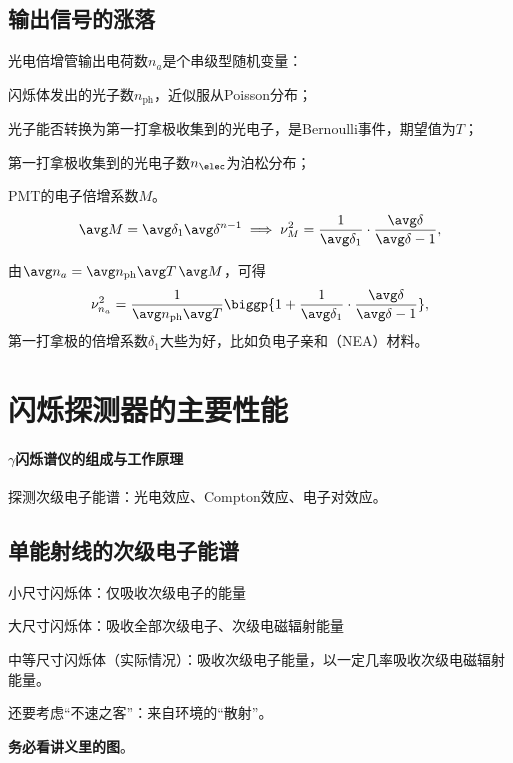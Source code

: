 \subsection{输出信号的涨落}

光电倍增管输出电荷数$n_a$是个串级型随机变量：
\begin{compactitem}
	\item 闪烁体发出的光子数$n_{\mathrm{ph}}$，近似服从Poisson分布；
	\item 光子能否转换为第一打拿极收集到的光电子，是Bernoulli事件，期望值为$T$；
	\item 第一打拿极收集到的光电子数$n_\elec$为泊松分布；
	\item PMT的电子倍增系数$M$。
	\[
		\avg M=\avg\delta_1\avg\delta^{n-1}\implies\nu_M^2=\frac1{\avg\delta_1}\cdot\frac{\avg\delta}{\avg\delta-1},
	\]
\end{compactitem}
由$\avg n_a=\avg n_{\mathrm{ph}}\avg T\,\avg M$，可得 
\begin{align}
	\nu_{n_a}^2=\frac1{\avg n_{\mathrm{ph}}\avg T}\biggp{1+\frac1{\avg\delta_1}\cdot\frac{\avg\delta}{\avg\delta-1}},
\end{align}
第一打拿极的倍增系数$\delta_1$大些为好，比如负电子亲和（NEA）材料。

\section{闪烁探测器的主要性能}

\paragraph{$\gamma$闪烁谱仪的组成与工作原理}
探测次级电子能谱：光电效应、Compton效应、电子对效应。

\subsection{单能\textgamma 射线的次级电子能谱}

\begin{compactitem}
	\item 小尺寸闪烁体：仅吸收次级电子的能量
	\item 大尺寸闪烁体：吸收全部次级电子、次级电磁辐射能量
	\item 中等尺寸闪烁体（实际情况）：吸收次级电子能量，以一定几率吸收次级电磁辐射能量。
\end{compactitem}
还要考虑“不速之客”：来自环境的“散射”。

\textbf{务必看讲义里的图}。

